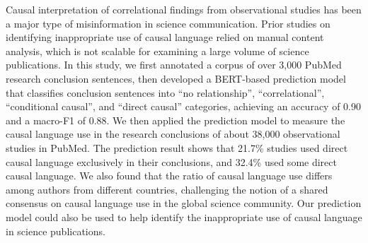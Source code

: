 Causal interpretation of correlational findings from observational studies has been a major type of misinformation in science communication. Prior studies on identifying inappropriate use of causal language relied on manual content analysis, which is not scalable for examining a large volume of science publications. In this study, we first annotated a corpus of over 3,000 PubMed research conclusion sentences, then developed a BERT-based prediction model that classifies conclusion sentences into “no relationship”, “correlational”, “conditional causal”, and “direct causal” categories, achieving an accuracy of 0.90 and a macro-F1 of 0.88. We then applied the prediction model to measure the causal language use in the research conclusions of about 38,000 observational studies in PubMed. The prediction result shows that 21.7\% studies used direct causal language exclusively in their conclusions, and 32.4\% used some direct causal language. We also found that the ratio of causal language use differs among authors from different countries, challenging the notion of a shared consensus on causal language use in the global science community. Our prediction model could also be used to help identify the inappropriate use of causal language in science publications.